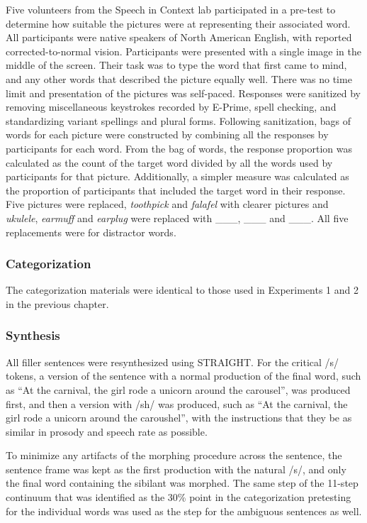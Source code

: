 Five volunteers from the Speech in Context lab participated in a pre-test to determine how suitable the pictures were at representing their associated word.  All participants were native speakers of North American English, with reported corrected-to-normal vision. Participants were presented with a single image in the middle of the screen.  Their task was to type the word that first came to mind, and any other words that described the picture equally well.  There was no time limit and presentation of the pictures was self-paced. Responses were sanitized by removing miscellaneous keystrokes recorded by E-Prime, spell checking, and standardizing variant spellings and plural forms.  Following sanitization, bags of words for each picture were constructed by combining all the responses by participants for each word.  From the bag of words, the response proportion was calculated as the count of the target word divided by all the words used by participants for that picture.  Additionally, a simpler measure was calculated as the proportion of participants that included the target word in their response. Five pictures were replaced, \emph{toothpick} and \emph{falafel} with clearer pictures and \emph{ukulele}, \emph{earmuff} and \emph{earplug} were replaced with ___, ___ and ___.  All five replacements were for distractor words.


\subsubsection{Categorization}

The categorization materials were identical to those used in Experiments 1 and 2 in the previous chapter.
	

\subsubsection{Synthesis}

All filler sentences were resynthesized using STRAIGHT.  For the critical /s/ tokens, a version of the sentence with a normal production of the final word, such as ``At the carnival, the girl rode a unicorn around the carousel'', was produced first, and then a version with /sh/ was produced, such as ``At the carnival, the girl rode a unicorn around the caroushel'', with the instructions that they be as similar in prosody and speech rate as possible.

To minimize any artifacts of the morphing procedure across the sentence, the sentence frame was kept as the first production with the natural /s/, and only the final word containing the sibilant was morphed.  The same step of the 11-step continuum that was identified as the 30\% point in the categorization pretesting for the individual words was used as the step for the ambiguous sentences as well.

